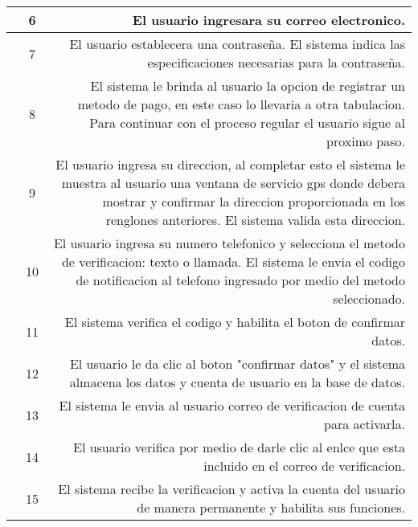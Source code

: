 \documentclass[conference]{IEEEtran}
\begin{document}
\begin{table}[H]
\begin{adjustbox}{width=0.47\textwidth}
\begin{tabular}{|p{11.215em}|r|r|}
    \midrule
    \multicolumn{1}{|r|}{} & \multicolumn{1}{c|}{6} & \multicolumn{1}{p{32em}|}{El usuario ingresara su correo electronico.} \\
    \midrule
    \multicolumn{1}{|r|}{} & \multicolumn{1}{c|}{7} & \multicolumn{1}{p{32em}|}{El usuario establecera una contraseña. El sistema indica las especificaciones necesarias para la contraseña.} \\
    \midrule
    \multicolumn{1}{|r|}{} & \multicolumn{1}{c|}{8} & \multicolumn{1}{p{32em}|}{El sistema le brinda al usuario la opcion de registrar un metodo de pago, en este caso lo llevaria a otra tabulacion. Para continuar con el proceso regular el usuario sigue al proximo paso.} \\
    \midrule
    \multicolumn{1}{|r|}{} & \multicolumn{1}{c|}{9} & \multicolumn{1}{p{32em}|}{El usuario ingresa su direccion, al completar esto el sistema le muestra al usuario una ventana de servicio gps donde debera mostrar y confirmar la direccion proporcionada en los renglones anteriores. El sistema valida esta direccion.} \\
    \midrule
    \multicolumn{1}{|r|}{} & \multicolumn{1}{c|}{10} & \multicolumn{1}{p{32em}|}{El usuario ingresa su numero telefonico y selecciona el metodo de verificacion: texto o llamada. El sistema le envia el codigo de notificacion al telefono ingresado por medio del metodo seleccionado.} \\
    \midrule
    \multicolumn{1}{|r|}{} & \multicolumn{1}{c|}{11} & \multicolumn{1}{p{32em}|}{El sistema verifica el codigo y habilita el boton de confirmar datos.} \\
    \midrule
    \multicolumn{1}{|r|}{} & \multicolumn{1}{c|}{12} & \multicolumn{1}{p{32em}|}{El usuario le da clic al boton "confirmar datos" y el sistema almacena los datos y cuenta de usuario en la base de datos.} \\
    \midrule
    \multicolumn{1}{|r|}{} & \multicolumn{1}{c|}{13} & \multicolumn{1}{p{32em}|}{El sistema le envia al usuario correo de verificacion de cuenta para activarla.} \\
    \midrule
    \multicolumn{1}{|r|}{} & \multicolumn{1}{c|}{14} & \multicolumn{1}{p{32em}|}{El usuario verifica por medio de darle clic al enlce que esta incluido en el correo de verificacion.} \\
    \midrule
    \multicolumn{1}{|r|}{} & \multicolumn{1}{c|}{15} & \multicolumn{1}{p{32em}|}{El sistema recibe la verificacion y activa la cuenta del usuario de manera permanente y habilita sus funciones.} \\

\end{tabular}
\end{adjustbox}
\end{table}
\end{document}
